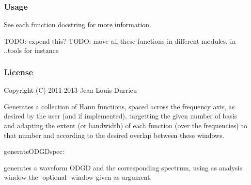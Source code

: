 \documentclass[letterpaper,10pt,english]{sphinxmanual}
\begin{document}
\subsubsection{Usage}
\label{reference/separateleadfunctions:usage}
See each function docstring for more information.

TODO: expend this?
TODO: move all these functions in different modules, in ..tools for instance


\subsubsection{License}
\label{reference/separateleadfunctions:license}
Copyright (C) 2011-2013 Jean-Louis Durrieu

\begin{fulllineitems}
\label{reference/separateleadfunctions:pyfasst.SeparateLeadStereo.separateLeadFunctions.generateHannBasis}
Generates a collection of Hann functions, spaced across the
frequency axis, as desired by the user (and if implemented),
targetting the given number of basis and adapting the extent (or bandwidth)
of each function (over the frequencies) to that number and according
to the desired overlap between these windows.

\end{fulllineitems}


\begin{fulllineitems}
\label{reference/separateleadfunctions:pyfasst.SeparateLeadStereo.separateLeadFunctions.generate_ODGD_spec}
generateODGDspec:

generates a waveform ODGD and the corresponding spectrum,
using as analysis window the -optional- window given as
argument.

\end{fulllineitems}
\end{document}

